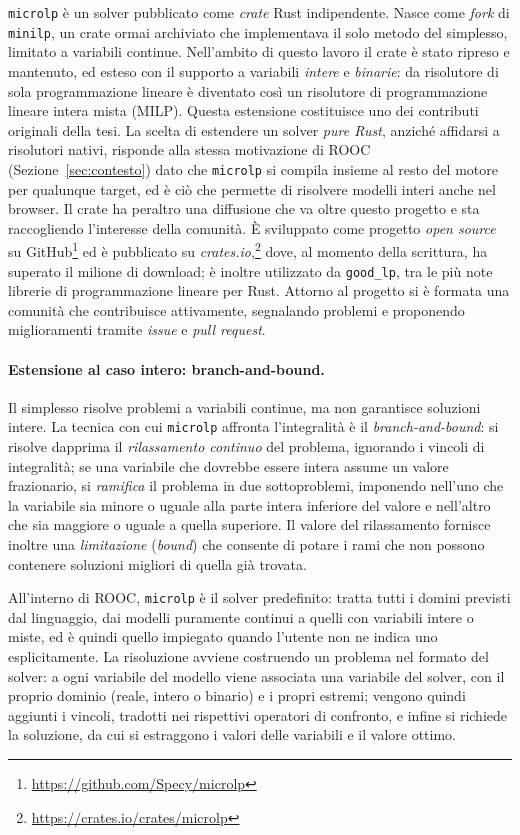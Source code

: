 \texttt{microlp} è un solver pubblicato come \emph{crate} Rust indipendente. Nasce
come \emph{fork} di \texttt{minilp}, un crate ormai archiviato che implementava il
solo metodo del simplesso, limitato a variabili continue. Nell'ambito di questo
lavoro il crate è stato ripreso e mantenuto, ed esteso con il supporto a variabili
\emph{intere} e \emph{binarie}: da risolutore di sola programmazione lineare è
diventato così un risolutore di programmazione lineare intera mista (MILP). Questa
estensione costituisce uno dei contributi originali della tesi. La scelta di
estendere un solver \emph{pure Rust}, anziché affidarsi a risolutori nativi,
risponde alla stessa motivazione di ROOC (Sezione~\ref{sec:contesto}) dato che
\texttt{microlp} si compila insieme al resto del motore per qualunque target, ed
è ciò che permette di risolvere modelli interi anche nel browser. Il crate ha
peraltro una diffusione che va oltre questo progetto e sta raccogliendo
l'interesse della comunità. È sviluppato come progetto \emph{open source} su
GitHub\footnote{\url{https://github.com/Specy/microlp}} ed è pubblicato su
\emph{crates.io},\footnote{\url{https://crates.io/crates/microlp}} dove, al
momento della scrittura, ha superato il milione di download; è inoltre utilizzato
da \texttt{good\_lp}, tra le più note librerie di programmazione lineare per Rust.
Attorno al progetto si è formata una comunità che contribuisce attivamente,
segnalando problemi e proponendo miglioramenti tramite \emph{issue} e
\emph{pull request}.

\paragraph{Estensione al caso intero: branch-and-bound.}
Il simplesso risolve problemi a variabili continue, ma non garantisce soluzioni
intere. La tecnica con cui \texttt{microlp} affronta l'integralità è il
\emph{branch-and-bound}: si risolve dapprima il \emph{rilassamento continuo} del
problema, ignorando i vincoli di integralità; se una variabile che dovrebbe essere
intera assume un valore frazionario, si \emph{ramifica} il problema in due
sottoproblemi, imponendo nell'uno che la variabile sia minore o uguale alla parte
intera inferiore del valore e nell'altro che sia maggiore o uguale a quella
superiore. Il valore del rilassamento fornisce inoltre una \emph{limitazione}
(\emph{bound}) che consente di potare i rami che non possono contenere soluzioni
migliori di quella già trovata.

All'interno di ROOC, \texttt{microlp} è il solver predefinito: tratta tutti i
domini previsti dal linguaggio, dai modelli puramente continui a quelli con
variabili intere o miste, ed è quindi quello impiegato quando l'utente non ne
indica uno esplicitamente. La risoluzione avviene costruendo un problema nel formato del
solver: a ogni variabile del modello viene associata una variabile del solver,
con il proprio dominio (reale, intero o binario) e i propri estremi; vengono
quindi aggiunti i vincoli, tradotti nei rispettivi operatori di confronto, e
infine si richiede la soluzione, da cui si estraggono i valori delle variabili e
il valore ottimo.

